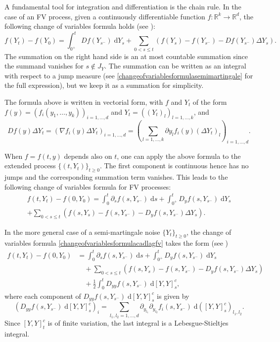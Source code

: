 \documentclass[reqno,12pt]{amsart}
\theoremstyle{plain} %
\theoremstyle{definition} %
\begin{document}
A fundamental tool for integration and differentiation is the chain rule. In the case of an FV process, given a continuously differentiable function $f:\mathbb{R}^k \rightarrow \mathbb{R}^d$, the following change of variables formula holds (see \cite[Theorems II.31 and II.33]{Protter2005}):
\begin{equation}
    f(Y_t) - f(Y_0) = \int_{0^+}^t Df(Y_{s^-}) \;\mathrm{d}Y_s + \sum_{0 < s \leq t} \left( f(Y_s) - f(Y_{s^{-}}) - Df(Y_{s^-})\Delta Y_s\right).
\end{equation}
The summation on the right hand side is an at most countable summation since the summand vanishes for $s \notin J_{Y}$. The summation can be written as an integral with respect to a jump measure (see \cref{changeofvariablesformulasemimartingale} for the full expression), but we keep it as a summation for simplicity.

The formula above is written in vectorial form, with $f$ and $Y_t$ of the form $f(y)=(f_i(y_1, \ldots, y_k))_{i=1, \ldots, d}$ and $Y_t = ((Y_t)_l)_{l=1, \ldots, k}$, and
\[
    Df(y)\Delta Y_t = \left( \nabla f_i(y)\Delta Y_t\right)_{i=1, \ldots, d} = \left( \sum_{l=1, \ldots, k} \partial y_l f_i(y) (\Delta Y_t)_l \right)_{i=1, \ldots, d}.
\]

When $f=f(t, y)$ depends also on $t$, one can apply the above formula to the extended process $\{(t, Y_t)\}_{t\geq 0}$. The first component is continuous hence has no jumps and the corresponding summation term vanishes. This leads to the following change of variables formula for FV processes:
\begin{multline}
    \label{changeofvariablesformulacadlagfv}
    f(t, Y_t) - f(0, Y_0) = \int_0^t \partial_s f(s, Y_{s^-})\;\mathrm{d}s + \int_{0^+}^t D_y f(s, Y_{s^-}) \;\mathrm{d}Y_s \\
    + \sum_{0 < s \leq t} \left( f(s, Y_s) - f(s, Y_{s^{-}}) - D_y f(s, Y_{s^-})\Delta Y_s\right).
\end{multline}

In the more general case of a semi-martingale noise $\{Y_t\}_{t\geq 0}$, the change of variables formula \cref{changeofvariablesformulacadlagfv} takes the form (see \cite[Theorems II.32 and II.33]{Protter2005})
\begin{equation}
    \label{changeofvariablesformulasemimartingale}
    \begin{aligned}
        f(t, Y_t) - f(0, Y_0) & = \int_0^t \partial_s f(s, Y_{s^-})\;\mathrm{d}s + \int_{0^+}^t D_y f(s, Y_{s^-}) \;\mathrm{d}Y_s \\
        & \quad + \sum_{0 < s \leq t} \left( f(s, Y_s) - f(s, Y_{s^{-}}) - D_y f(s, Y_{s^-})\Delta Y_s\right) \\
        & \quad + \frac{1}{2}\int_0^t D_{yy}f(s, Y_{s^-})\;\mathrm{d}[Y, Y]_s^c,
    \end{aligned}
\end{equation}
where each component of $D_{yy}f(s, Y_{s^-})\;\mathrm{d}[Y, Y]_s^c$ is given by
\[ \left(D_{yy}f(s, Y_{s^-})\;\mathrm{d}[Y, Y]_s^c\right)_i = \sum_{l_1, l_2 = 1, \ldots, d} \partial_{y_{l_1}}\partial_{y_{l_2}} f_i(s, Y_{s^-})\;\mathrm{d}([Y, Y]_s^c)_{l_1, l_2}.
\]
Since $[Y, Y]_t^c$ is of finite variation, the last integral is a Lebesgue-Stieltjes integral.
\end{document}
